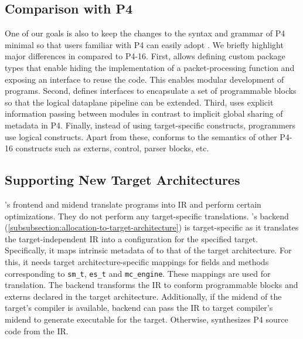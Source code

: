 \documentclass[letterpaper,twocolumn,10pt]{article}
\begin{document}
\subsection{Comparison with P4}
\label{sec:comparison}
One of our goals is also to keep the changes to the syntax and grammar
of P4 minimal so that users familiar with P4 can easily adopt \ulang.
We briefly highlight major differences in \ulang compared to P4-16.
First, \ulang allows defining custom package types that enable hiding
the implementation of a packet-processing function and exposing an
interface to reuse the code. This enables modular development of
\ulang programs. Second, \uarch defines interfaces to encapsulate a
set of programmable blocks so that the logical dataplane pipeline can
be extended. Third, \uarch uses explicit information passing between
modules in contrast to implicit global sharing of metadata in P4.
Finally, instead of using target-specific constructs, programmers use
logical \uarch constructs. Apart from these, \ulang conforms to the
semantics of other P4-16 constructs such as externs, control, parser
blocks, etc.






\subsection{Supporting New Target Architectures}
\label{sec:new-target}
\ucomp's frontend and midend translate \ulang programs into \uarch IR
and perform certain optimizations. They do not perform any
target-specific translations. \ucomp's backend
(\cref{subsubsection:allocation-to-target-architecture}) is
target-specific as it translates the target-independent \uarch IR into
a configuration for the specified target. Specifically, it maps
intrinsic metadata of \uarch to that of the target architecture. For
this, it needs target architecture-specific mappings for fields and
methods corresponding to \texttt{sm\_t}, \texttt{es\_t} and
\texttt{mc\_engine}. These mappings are used for translation. The
backend transforms the IR to conform programmable blocks and externs
declared in the target architecture. Additionally, if the midend of
the target's compiler is available, \ucomp backend can pass the IR to
target compiler's midend to generate executable for the target.
Otherwise, \ucomp synthesizes P4 source code from the IR.
\end{document}
